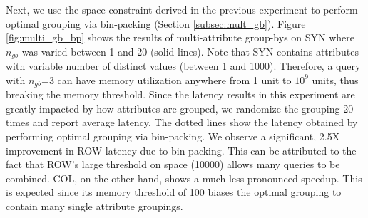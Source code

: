 
Next, we use the space constraint derived in the previous experiment
to perform optimal grouping via bin-packing (Section \ref{subsec:mult_gb}).
Figure \ref{fig:multi_gb_bp} shows the results of multi-attribute group-bys on SYN where
$n_{gb}$ was varied between 1 and 20 (solid lines).
Note that SYN contains attributes with variable number of distinct values (between 1 and 1000). 
Therefore, a query with
$n_{gb}$=3 can have memory utilization anywhere from 1 unit to $10^9$ units, thus breaking the
memory threshold.
Since the latency results in this experiment are greatly impacted by how attributes are grouped,
we randomize the grouping 20 times and report average latency.
The dotted lines show the latency obtained by performing optimal grouping via bin-packing.
We observe a significant, 2.5X improvement in ROW latency due to bin-packing.
This can be attributed to the fact that ROW's large threshold on space (10000) allows many queries
to be combined.
COL, on the other hand, shows a much less pronounced speedup. This is expected since its memory
threshold of 100 biases the optimal grouping to contain many single attribute groupings.


 
